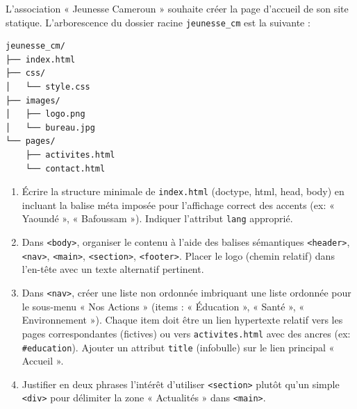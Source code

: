 \documentclass[11pt]{article}
\begin{document}
\begin{exercice}
L'association « Jeunesse Cameroun » souhaite créer la page d'accueil de son site statique. L'arborescence du dossier racine \texttt{jeunesse\_cm} est la suivante :
\begin{lstlisting}[style=arbo]
jeunesse_cm/
├── index.html
├── css/
│   └── style.css
├── images/
│   ├── logo.png
│   └── bureau.jpg
└── pages/
    ├── activites.html
    └── contact.html
\end{lstlisting}
\begin{enumerate}
    \item Écrire la structure minimale de \texttt{index.html} (doctype, html, head, body) en incluant la balise méta imposée pour l'affichage correct des accents (ex: « Yaoundé », « Bafoussam »). Indiquer l'attribut \texttt{lang} approprié.
    \item Dans \texttt{<body>}, organiser le contenu à l'aide des balises sémantiques \texttt{<header>}, \texttt{<nav>}, \texttt{<main>}, \texttt{<section>}, \texttt{<footer>}. Placer le logo (chemin relatif) dans l'en-tête avec un texte alternatif pertinent.
    \item Dans \texttt{<nav>}, créer une liste non ordonnée imbriquant une liste ordonnée pour le sous-menu « Nos Actions » (items : « Éducation », « Santé », « Environnement »). Chaque item doit être un lien hypertexte relatif vers les pages correspondantes (fictives) ou vers \texttt{activites.html} avec des ancres (ex: \texttt{\#education}). Ajouter un attribut \texttt{title} (infobulle) sur le lien principal « Accueil ».
    \item Justifier en deux phrases l'intérêt d'utiliser \texttt{<section>} plutôt qu'un simple \texttt{<div>} pour délimiter la zone « Actualités » dans \texttt{<main>}.
\end{enumerate}
\end{exercice}
\end{document}

